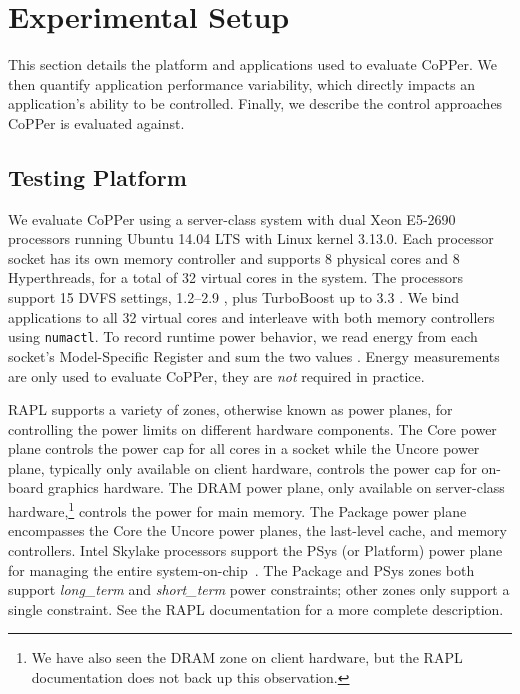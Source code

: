 \section{Experimental Setup}
\label{sec:copper-usage}

This section details the platform and applications used to evaluate CoPPer.
We then quantify application performance variability, which directly impacts an application's ability to be controlled.
Finally, we describe the control approaches CoPPer is evaluated against.

\subsection{Testing Platform}

We evaluate CoPPer using a server-class system with dual Xeon E5-2690 processors running Ubuntu 14.04 LTS with Linux kernel 3.13.0.
Each processor socket has its own memory controller and supports 8 physical cores and 8 Hyperthreads, for a total of 32 virtual cores in the system.
The processors support 15 DVFS settings, 1.2--2.9 \GHz, plus TurboBoost up to 3.3 \GHz.
We bind applications to all 32 virtual cores and interleave with both memory controllers using \mbox{\texttt{numactl}}.
To record runtime power behavior, we read energy from each socket's Model-Specific Register and sum the two values \cite{SandyBridge,energymon}.
Energy measurements are only used to evaluate CoPPer, they are \emph{not} required in practice.

RAPL supports a variety of zones, otherwise known as power planes, for controlling the power limits on different hardware components.
The Core power plane controls the power cap for all cores in a socket while the Uncore power plane, typically only available on client hardware, controls the power cap for on-board graphics hardware.
The DRAM power plane, only available on server-class hardware,\footnote{We have also seen the DRAM zone on client hardware, but the RAPL documentation does not back up this observation.} controls the power for main memory.
The Package power plane encompasses the Core the Uncore power planes, the last-level cache, and memory controllers.
Intel Skylake processors support the PSys (or Platform) power plane for managing the entire system-on-chip~\cite{skylake}.
The Package and PSys zones both support \emph{long\_term} and \emph{short\_term} power constraints; other zones only support a single constraint.
See the RAPL documentation for a more complete description.

